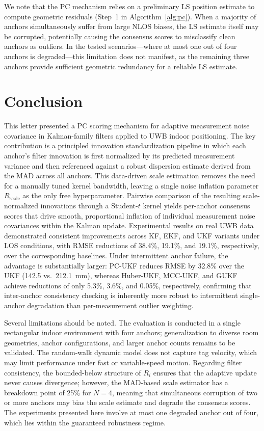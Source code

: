 \documentclass[journal]{IEEEtran}
\begin{document}
We note that the PC mechanism relies on a preliminary LS position estimate to compute geometric residuals (Step~1 in Algorithm~\ref{alg:pc}). When a majority of anchors simultaneously suffer from large NLOS biases, the LS estimate itself may be corrupted, potentially causing the consensus scores to misclassify clean anchors as outliers. In the tested scenarios---where at most one out of four anchors is degraded---this limitation does not manifest, as the remaining three anchors provide sufficient geometric redundancy for a reliable LS estimate.


\section{Conclusion}

This letter presented a PC scoring mechanism for adaptive measurement noise covariance in Kalman-family filters applied to UWB indoor positioning. The key contribution is a principled innovation standardization pipeline in which each anchor's filter innovation is first normalized by its predicted measurement variance and then referenced against a robust dispersion estimate derived from the MAD across all anchors. This data-driven scale estimation removes the need for a manually tuned kernel bandwidth, leaving a single noise inflation parameter $R_{\text{scale}}$ as the only free hyperparameter. Pairwise comparison of the resulting scale-normalized innovations through a Student-$t$ kernel yields per-anchor consensus scores that drive smooth, proportional inflation of individual measurement noise covariances within the Kalman update. Experimental results on real UWB data demonstrated consistent improvements across KF, EKF, and UKF variants under LOS conditions, with RMSE reductions of 38.4\%, 19.1\%, and 19.1\%, respectively, over the corresponding baselines. Under intermittent anchor failure, the advantage is substantially larger: PC-UKF reduces RMSE by 32.8\% over the UKF (142.5 vs.\ 212.1~mm), whereas Huber-UKF, MCC-UKF, and GUKF achieve reductions of only 5.3\%, 3.6\%, and 0.05\%, respectively, confirming that inter-anchor consistency checking is inherently more robust to intermittent single-anchor degradation than per-measurement outlier weighting.

Several limitations should be noted. The evaluation is conducted in a single rectangular indoor environment with four anchors; generalization to diverse room geometries, anchor configurations, and larger anchor counts remains to be validated. The random-walk dynamic model does not capture tag velocity, which may limit performance under fast or variable-speed motion. Regarding filter consistency, the bounded-below structure of $R_i$ ensures that the adaptive update never causes divergence; however, the MAD-based scale estimator has a breakdown point of 25\% for $N=4$, meaning that simultaneous corruption of two or more anchors may bias the scale estimate and degrade the consensus scores. The experiments presented here involve at most one degraded anchor out of four, which lies within the guaranteed robustness regime.
\end{document}
